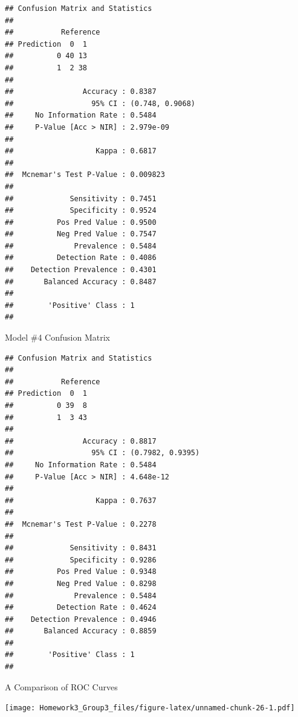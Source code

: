 \documentclass[
]{article}
\begin{document}
\begin{verbatim}
## Confusion Matrix and Statistics
## 
##           Reference
## Prediction  0  1
##          0 40 13
##          1  2 38
##                                          
##                Accuracy : 0.8387         
##                  95% CI : (0.748, 0.9068)
##     No Information Rate : 0.5484         
##     P-Value [Acc > NIR] : 2.979e-09      
##                                          
##                   Kappa : 0.6817         
##                                          
##  Mcnemar's Test P-Value : 0.009823       
##                                          
##             Sensitivity : 0.7451         
##             Specificity : 0.9524         
##          Pos Pred Value : 0.9500         
##          Neg Pred Value : 0.7547         
##              Prevalence : 0.5484         
##          Detection Rate : 0.4086         
##    Detection Prevalence : 0.4301         
##       Balanced Accuracy : 0.8487         
##                                          
##        'Positive' Class : 1              
## 
\end{verbatim}

Model \#4 Confusion Matrix

\begin{verbatim}
## Confusion Matrix and Statistics
## 
##           Reference
## Prediction  0  1
##          0 39  8
##          1  3 43
##                                           
##                Accuracy : 0.8817          
##                  95% CI : (0.7982, 0.9395)
##     No Information Rate : 0.5484          
##     P-Value [Acc > NIR] : 4.648e-12       
##                                           
##                   Kappa : 0.7637          
##                                           
##  Mcnemar's Test P-Value : 0.2278          
##                                           
##             Sensitivity : 0.8431          
##             Specificity : 0.9286          
##          Pos Pred Value : 0.9348          
##          Neg Pred Value : 0.8298          
##              Prevalence : 0.5484          
##          Detection Rate : 0.4624          
##    Detection Prevalence : 0.4946          
##       Balanced Accuracy : 0.8859          
##                                           
##        'Positive' Class : 1               
## 
\end{verbatim}

A Comparison of ROC Curves

\texttt{[image: Homework3\_Group3\_files/figure-latex/unnamed-chunk-26-1.pdf]}
\end{document}
